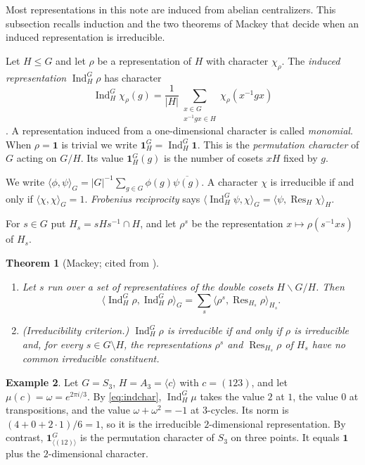\documentclass[12pt,letterpaper]{article}
\numberwithin{equation}{section}
\theoremstyle{plain}
\newtheorem{theorem}{Theorem}[section]
\theoremstyle{definition}
\newtheorem{example}[theorem]{Example}
\DeclareMathOperator{\Ind}{Ind}
\DeclareMathOperator{\Res}{Res}
\newcommand{\triv}{\mathbf{1}}
\begin{document}
Most representations in this note are induced from abelian centralizers.
This subsection recalls induction and the two theorems of Mackey that decide
when an induced representation is irreducible.

Let $H\le G$ and let $\rho$ be a representation of $H$ with character
$\chi_\rho$. The \emph{induced representation} $\Ind_H^G\rho$ has character
\begin{equation}\label{eq:indchar}
\Ind_H^G\chi_\rho(g)=\frac{1}{|H|}\sum_{\substack{x\in G\\ x^{-1}gx\in H}}
\chi_\rho(x^{-1}gx)
\end{equation}
\cite[\S7.2]{Se77}. A representation induced from a one-dimensional
character is called \emph{monomial}. When $\rho=\triv$ is trivial we write
$\triv_H^G=\Ind_H^G\triv$. This is the \emph{permutation character} of $G$
acting on $G/H$. Its value $\triv_H^G(g)$ is the number of cosets $xH$
fixed by $g$.

We write $\langle\phi,\psi\rangle_G=|G|^{-1}\sum_{g\in G}\phi(g)
\overline{\psi(g)}$. A character $\chi$ is irreducible if and only if
$\langle\chi,\chi\rangle_G=1$. \emph{Frobenius reciprocity} says
$\langle\Ind_H^G\psi,\chi\rangle_G=\langle\psi,\Res_H\chi\rangle_H$.

For $s\in G$ put $H_s=sHs^{-1}\cap H$, and let $\rho^s$ be the
representation $x\mapsto\rho(s^{-1}xs)$ of $H_s$.

\begin{theorem}[Mackey; cited from {\cite[\S7.3--7.4]{Se77}}]
\label{thm:mackey}
\begin{enumerate}[label=(\alph*),itemsep=1pt]
\item Let $s$ run over a set of representatives of the double cosets
  $H\backslash G/H$. Then
  \[
  \langle\Ind_H^G\rho,\Ind_H^G\rho\rangle_G=\sum_{s}
  \langle\rho^s,\Res_{H_s}\rho\rangle_{H_s}.
  \]
\item (Irreducibility criterion.) $\Ind_H^G\rho$ is irreducible if and only
  if $\rho$ is irreducible and, for every $s\in G\setminus H$, the
  representations $\rho^s$ and $\Res_{H_s}\rho$ of $H_s$ have no common
  irreducible constituent.
\end{enumerate}
\end{theorem}

\begin{example}\label{ex:s3ind}
Let $G=S_3$, $H=A_3=\langle c\rangle$ with $c=(123)$, and let $\mu(c)=\omega
=e^{2\pi i/3}$. By \eqref{eq:indchar}, $\Ind_H^G\mu$ takes the value $2$ at
$1$, the value $0$ at transpositions, and the value $\omega+\omega^2=-1$ at
$3$-cycles. Its norm is $(4+0+2\cdot1)/6=1$, so it is the irreducible
$2$-dimensional representation. By contrast, $\triv_{\langle(12)\rangle}^G$
is the permutation character of $S_3$ on three points. It equals $\triv$
plus the $2$-dimensional character.
\end{example}
\end{document}
